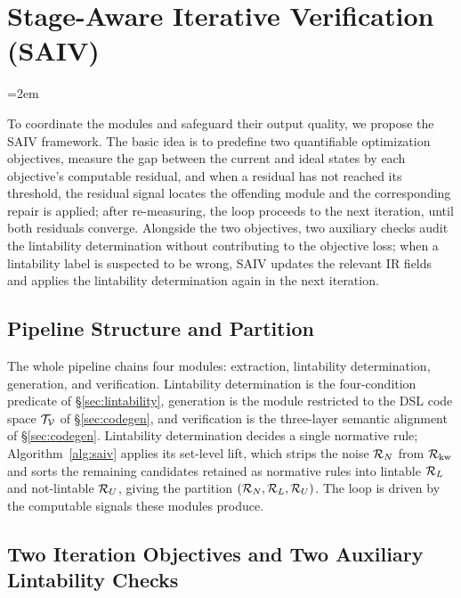 \section{Stage-Aware Iterative Verification (SAIV)}
\label{sec:saiv}

\begingroup\emergencystretch=2em\relax

To coordinate the modules and safeguard their output quality, we propose the SAIV framework.
The basic idea is to predefine two quantifiable optimization
objectives, measure the gap between the current and ideal states by each
objective's computable residual, and when a residual has not reached its
threshold, the residual signal locates the offending module
and the corresponding repair is applied; after re-measuring, the loop proceeds
to the next iteration, until both residuals converge. Alongside the two objectives, two
auxiliary checks audit the lintability determination without contributing to the
objective loss; when a lintability label is suspected to be wrong, SAIV updates
the relevant IR fields and applies the lintability determination again in the next
iteration.

\subsection{Pipeline Structure and Partition}
\label{subsec:saiv-formal}

The whole pipeline chains four modules: extraction, lintability determination,
generation, and verification. Lintability determination is the four-condition
predicate of \S\ref{sec:lintability}, generation is the module restricted to the
DSL code space $\mathcal{T}_{\mathcal{V}}$ of \S\ref{sec:codegen}, and verification is the three-layer
semantic alignment of \S\ref{sec:codegen}. Lintability determination decides a
single normative rule; Algorithm~\ref{alg:saiv} applies its set-level lift, which
strips the noise $\mathcal{R}_N$ from $\mathcal{R}_{\mathrm{kw}}$ and sorts the remaining candidates retained as
normative rules into lintable $\mathcal{R}_L$ and not-lintable $\mathcal{R}_U$, giving the partition
$(\mathcal{R}_N, \mathcal{R}_L, \mathcal{R}_U)$. The loop is driven by the computable signals these modules
produce.

\subsection{Two Iteration Objectives and Two Auxiliary Lintability Checks}
\label{subsec:targets}

